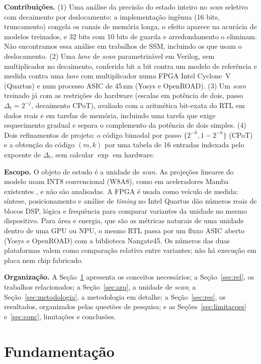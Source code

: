 \documentclass[12pt]{article}
\begin{document}
\textbf{Contribuições.} (1) Uma análise da precisão do estado inteiro no \emph{scan} seletivo com decaimento por deslocamento: a implementação ingênua (16 bits, truncamento) congela os canais de memória longa, o efeito aparece na acurácia de modelos treinados, e 32 bits com 10 bits de guarda e arredondamento o eliminam. Não encontramos essa análise em trabalhos de SSM, incluindo os que usam o deslocamento. (2) Uma \emph{lane} de \emph{scan} parametrizável em Verilog, sem multiplicador no decaimento, conferida bit a bit contra um modelo de referência e medida contra uma \emph{lane} com multiplicador numa FPGA Intel Cyclone~V (Quartus) e num processo ASIC de 45\,nm (Yosys e OpenROAD). (3) Um \emph{scan} treinado já com as restrições do hardware (escalas em potência de dois, passo $\Delta_t = 2^{-j}$, decaimento CPoT), avaliado com a aritmética bit-exata do RTL em dados reais e em tarefas de memória, incluindo uma tarefa que exige esquecimento gradual e separa o complemento da potência de dois simples. (4) Dois refinamentos de projeto: o código bimodal por passo $\{2^{-k}, 1-2^{-k}\}$ (CPoT) e a obtenção do código $(m,k)$ por uma tabela de 16 entradas indexada pelo expoente de $\Delta_t$, sem calcular $\exp$ em hardware.

\textbf{Escopo.} O objeto de estudo é a unidade de \emph{scan}. As projeções lineares do modelo usam INT8 convencional (W8A8), como em aceleradores Mamba existentes \cite{fastmamba2025}, e não são analisadas. A FPGA é usada como veículo de medida: síntese, posicionamento e análise de \emph{timing} no Intel Quartus dão números reais de blocos DSP, lógica e frequência para comparar variantes da unidade no mesmo dispositivo. Para área e energia, que são as métricas naturais de uma unidade dentro de uma GPU ou NPU, o mesmo RTL passa por um fluxo ASIC aberto (Yosys e OpenROAD) com a biblioteca Nangate45. Os números das duas plataformas valem como comparação relativa entre variantes; não há execução em placa nem chip fabricado.

\textbf{Organização.} A Seção~\ref{sec:fund} apresenta os conceitos necessários; a Seção~\ref{sec:rel}, os trabalhos relacionados; a Seção~\ref{sec:arq}, a unidade de \emph{scan}; a Seção~\ref{sec:metodologia}, a metodologia em detalhe; a Seção~\ref{sec:res}, os resultados, organizados pelas questões de pesquisa; e as Seções~\ref{sec:limitacoes} e~\ref{sec:conc}, limitações e conclusões.

\section{Fundamentação}
\label{sec:fund}
\end{document}
